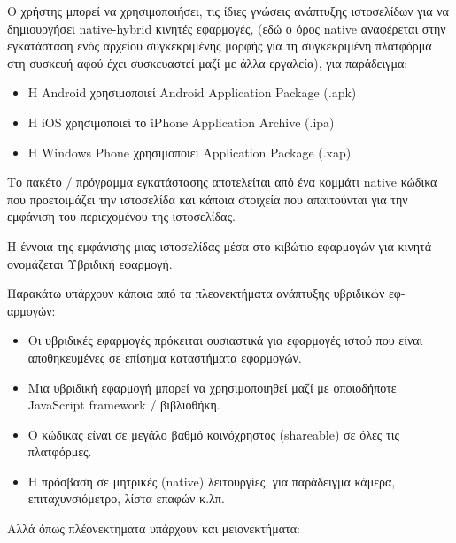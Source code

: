 \documentclass[a4paper,12pt]{article}
\begin{document}
			Ο χρήστης μπορεί να χρησιμοποιήσει, τις ίδιες γνώσεις ανάπτυξης ιστοσελίδων για να δημιουργήσει native-hybrid κινητές εφαρμογές, (εδώ ο όρος native 
			αναφέρεται στην εγκατάσταση ενός αρχείου συγκεκριμένης μορφής για τη συγκεκριμένη πλατφόρμα στη συσκευή αφού έχει συσκευαστεί μαζί με άλλα εργαλεία), για παράδειγμα:
			\begin{itemize}

				\item Η Android χρησιμοποιεί Android Application Package (.apk)				
				\item Η iOS χρησιμοποιεί το iPhone Application Archive (.ipa)
				\item Η Windows Phone χρησιμοποιεί Application Package (.xap)
				
			\end{itemize}
			Το πακέτο / πρόγραμμα εγκατάστασης αποτελείται από ένα κομμάτι native κώδικα που προετοιμάζει την ιστοσελίδα
			και κάποια στοιχεία που απαιτούνται για την εμφάνιση του περιεχομένου της ιστοσελίδας.

			Η έννοια της εμφάνισης μιας ιστοσελίδας μέσα στο κιβώτιο εφαρμογών για κινητά ονομάζεται Υβριδική εφαρμογή.

			Παρακάτω υπάρχουν κάποια από τα πλεονεκτήματα ανάπτυξης υβριδικών εφ-
			αρμογών:
		
			\begin{itemize}
				\item Οι υβριδικές εφαρμογές πρόκειται ουσιαστικά για εφαρμογές ιστού που είναι αποθηκευμένες σε επίσημα καταστήματα εφαρμογών.
			
				\item Μια υβριδική εφαρμογή μπορεί να χρησιμοποιηθεί μαζί με οποιοδήποτε JavaScript framework / βιβλιοθήκη.
				
				\item Ο κώδικας είναι σε μεγάλο βαθμό κοινόχρηστος (shareable) σε όλες τις πλατφόρμες.
				
				\item Η πρόσβαση σε μητρικές (native) λειτουργίες, για παράδειγμα κάμερα, επιταχυνσιόμετρο, λίστα επαφών κ.λπ.
			\end{itemize}
			
			Αλλά όπως πλέονεκτηματα υπάρχουν και μειονεκτήματα:
			
\end{document}
